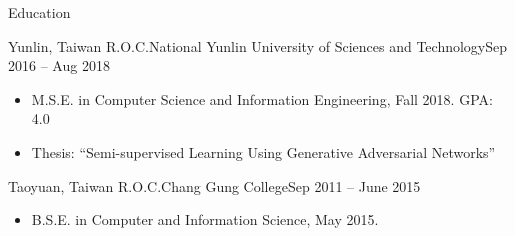 \documentclass[]{mcdowellcv}
\begin{document}
	\begin{cvsection}{Education}
		\begin{cvsubsection}{Yunlin, Taiwan R.O.C.}{National Yunlin University of Sciences and Technology}{Sep 2016 -- Aug 2018}
			\bigskip
			\begin{itemize}
				\item M.S.E. in Computer Science and Information Engineering, Fall 2018.  GPA: 4.0
				\item Thesis: “Semi-supervised Learning Using Generative Adversarial Networks”
			\end{itemize}
		\end{cvsubsection}
		\begin{cvsubsection}{Taoyuan, Taiwan R.O.C.}{Chang Gung College}{Sep 2011 -- June 2015}
			\begin{itemize}
				\item B.S.E. in Computer and Information Science, May 2015. 
			\end{itemize}
		\end{cvsubsection}
	\end{cvsection}
	
\end{document}
